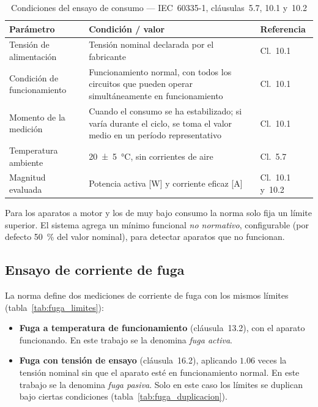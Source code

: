 \begin{table}[H]
\centering
\caption{Condiciones del ensayo de consumo --- IEC~60335-1, cláusulas~5.7, 10.1 y~10.2}
\label{tab:potencia_condiciones}
\renewcommand{\arraystretch}{1.35}
\begin{tabular}{@{} p{4.5cm} p{6cm} p{2.5cm} @{}}
\toprule
\textbf{Parámetro} & \textbf{Condición / valor} & \textbf{Referencia} \\
\midrule
Tensión de alimentación
    & Tensión nominal declarada por el fabricante
    & Cl.~10.1 \\
\addlinespace
Condición de funcionamiento
    & Funcionamiento normal, con todos los circuitos que pueden
      operar simultáneamente en funcionamiento
    & Cl.~10.1 \\
\addlinespace
Momento de la medición
    & Cuando el consumo se ha estabilizado; si varía durante el ciclo,
      se toma el valor medio en un período representativo
    & Cl.~10.1 \\
\addlinespace
Temperatura ambiente
    & \SI{20 \pm 5}{\celsius}, sin corrientes de aire
    & Cl.~5.7 \\
\addlinespace
Magnitud evaluada
    & Potencia activa [\si{\watt}] y corriente eficaz [\si{\ampere}]
    & Cl.~10.1 y~10.2 \\
\bottomrule
\end{tabular}
\end{table}

\noindent Para los aparatos a motor y los de muy bajo consumo la norma
solo fija un límite superior. El sistema agrega un mínimo funcional
\emph{no normativo}, configurable (por defecto \SI{50}{\percent} del valor
nominal), para detectar aparatos que no funcionan.

\subsection{Ensayo de corriente de fuga}
\label{subsec:tabla_fuga}

La norma define dos mediciones de corriente de fuga con los mismos
límites (tabla~\ref{tab:fuga_limites}):
\begin{itemize}
    \item \textbf{Fuga a temperatura de funcionamiento} (cláusula~13.2),
          con el aparato funcionando. En este trabajo se la denomina
          \emph{fuga activa}.
    \item \textbf{Fuga con tensión de ensayo} (cláusula~16.2), aplicando
          $\num{1.06}$ veces la tensión nominal sin que el aparato esté en
          funcionamiento normal. En este trabajo se la denomina
          \emph{fuga pasiva}. Solo en este caso los límites se duplican
          bajo ciertas condiciones (tabla~\ref{tab:fuga_duplicacion}).
\end{itemize}

